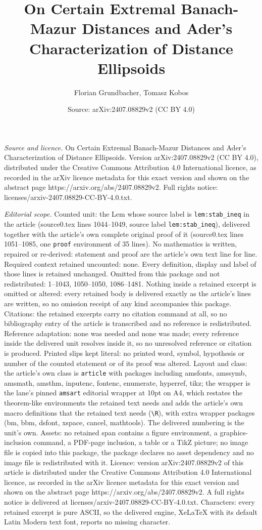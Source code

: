 \documentclass[10pt,a4paper]{amsart}
\title[On Certain Extremal Banach-Mazur Distances and Ader's Charac]{On Certain Extremal Banach-Mazur Distances and Ader's Characterization of Distance Ellipsoids}
\author{Florian Grundbacher, Tomasz Kobos}
\date{Source: arXiv:2407.08829v2 (CC BY 4.0)}
\begin{document}
\maketitle

\noindent\emph{Source and licence.} On Certain Extremal Banach-Mazur Distances and Ader's Characterization of Distance Ellipsoids. Version arXiv:2407.08829v2 (CC BY 4.0), distributed under the Creative Commons Attribution 4.0 International licence, as recorded in the arXiv licence metadata for this exact version and shown on the abstract page https://arxiv.org/abs/2407.08829v2. Full rights notice: licenses/arxiv-2407.08829-CC-BY-4.0.txt.\par\smallskip

\noindent\textit{Editorial scope.} Counted unit: the Lem whose source label is \texttt{lem:stab\_ineq} in the article (source0.tex lines 1044--1049, source label \texttt{lem:stab\_ineq}), delivered together with the article's own complete original proof of it (source0.tex lines 1051--1085, one \texttt{proof} environment of 35 lines). No mathematics is written, repaired or re-derived: statement and proof are the article's own text line for line. Required context retained uncounted: none. Every definition, display and label of those lines is retained unchanged. Omitted from this package and not redistributed: 1--1043, 1050--1050, 1086--1481. Nothing inside a retained excerpt is omitted or altered: every retained body is delivered exactly as the article's lines are written, so no omission receipt of any kind accompanies this package. Citations: the retained excerpts carry no citation command at all, so no bibliography entry of the article is transcribed and no reference is redistributed. Reference adaptation: none was needed and none was made; every reference inside the delivered unit resolves inside it, so no unresolved reference or citation is produced. Printed slips kept literal: no printed word, symbol, hypothesis or number of the counted statement or of its proof was altered. Layout and class: the article's own class is \texttt{article} with packages including amsfonts, amssymb, amsmath, amsthm, inputenc, fontenc, enumerate, hyperref, tikz; the wrapper is the lane's pinned \texttt{amsart} editorial wrapper at 10pt on A4, which restates the theorem-like environments the retained text needs and adds the article's own macro definitions that the retained text needs (\texttt{\textbackslash R}), with extra wrapper packages (bm, bbm, dsfont, xspace, cancel, mathtools). The delivered numbering is the unit's own. Assets: no retained span contains a figure environment, a graphics-inclusion command, a PDF-page inclusion, a table or a TikZ picture; no image file is copied into this package, the package declares no asset dependency and no image file is redistributed with it. Licence: version arXiv:2407.08829v2 of this article is distributed under the Creative Commons Attribution 4.0 International licence, as recorded in the arXiv licence metadata for this exact version and shown on the abstract page https://arxiv.org/abs/2407.08829v2. A full rights notice is delivered at licenses/arxiv-2407.08829-CC-BY-4.0.txt. Characters: every retained excerpt is pure ASCII, so the delivered engine, XeLaTeX with its default Latin Modern text font, reports no missing character.
\end{document}
